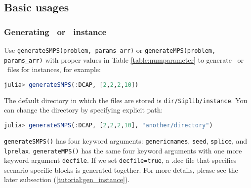 \subsection{Basic usages}
\subsubsection{Generating \smps\ or \mps\ instance}
Use \texttt{generateSMPS(problem, params\_arr)} or \texttt{generateMPS(problem, params\_arr)} with proper values in Table \ref{table:numparameter} to generate \smps\ or \mps\ files for instances, for example:
\begin{lstlisting}[frame=single,language=julia]
julia> generateSMPS(:DCAP, [2,2,2,10])
\end{lstlisting}
The default directory in which the files are stored is \texttt{dir/Siplib/instance}. You can change the directory by specifying explicit path:
\begin{lstlisting}[frame=single,language=julia]
julia> generateSMPS(:DCAP, [2,2,2,10], "another/directory")
\end{lstlisting}
\texttt{generateSMPS()} has four keyword arguments: \texttt{genericnames}, \texttt{seed}, \texttt{splice}, and \texttt{lprelax}. \texttt{generateMPS()} has the same four keyword arguments with one more keyword argument \texttt{decfile}. If we set \texttt{decfile=true}, a .dec file that specifies scenario-specific blocks is generated together. For more details, please see the later subsection (\ref{tutorial:gen_instance}).

